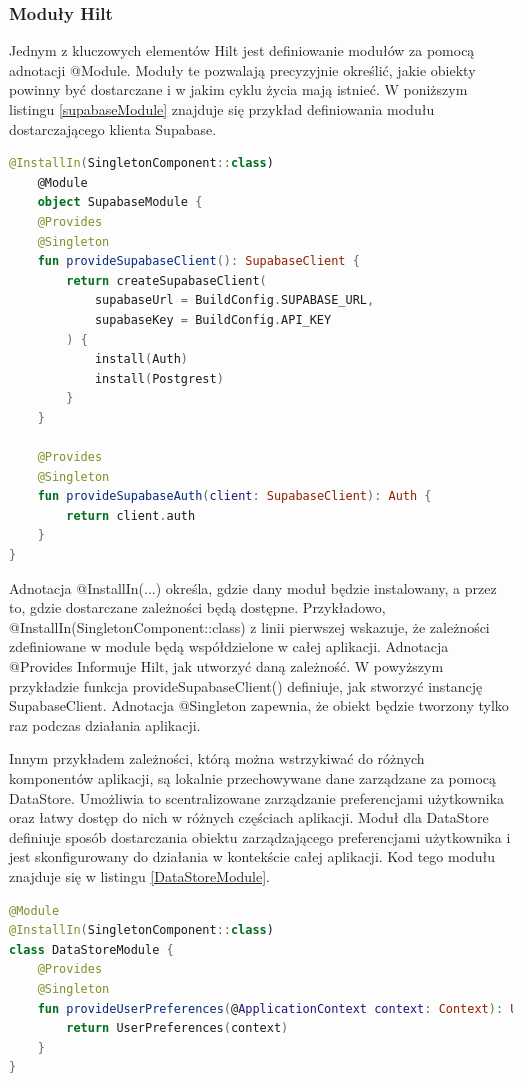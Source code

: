 \documentclass[12pt,twoside]{article}
\begin{document}
\subsubsection{Moduły Hilt}

Jednym z kluczowych elementów Hilt jest definiowanie modułów za pomocą adnotacji @Module. Moduły te pozwalają 
precyzyjnie określić, jakie obiekty powinny być dostarczane i w jakim cyklu życia mają istnieć. W poniższym listingu
\ref{supabaseModule} znajduje się przykład definiowania modułu dostarczającego klienta Supabase.
\begin{lstlisting}[language=Kotlin,caption=Przykład modułu klienta Supabase, label={supabaseModule}]
	@InstallIn(SingletonComponent::class)
	@Module
	object SupabaseModule {
    @Provides
    @Singleton
    fun provideSupabaseClient(): SupabaseClient {
        return createSupabaseClient(
            supabaseUrl = BuildConfig.SUPABASE_URL,
            supabaseKey = BuildConfig.API_KEY
        ) {
            install(Auth)
            install(Postgrest)
        }
    }

    @Provides
    @Singleton
    fun provideSupabaseAuth(client: SupabaseClient): Auth {
        return client.auth
    }
}
\end{lstlisting}
Adnotacja @InstallIn(...) określa, gdzie dany moduł będzie instalowany, a przez to, gdzie dostarczane zależności 
będą dostępne. Przykładowo, @InstallIn(SingletonComponent::class) z linii pierwszej wskazuje, że zależności 
zdefiniowane w module będą współdzielone w całej aplikacji. Adnotacja @Provides
Informuje Hilt, jak utworzyć daną zależność. W powyższym przykładzie funkcja provideSupabaseClient() definiuje, jak 
stworzyć instancję SupabaseClient. Adnotacja @Singleton zapewnia, że obiekt będzie tworzony tylko raz podczas działania 
aplikacji.

Innym przykładem zależności, którą można wstrzykiwać do różnych komponentów aplikacji, są lokalnie przechowywane 
dane zarządzane za pomocą DataStore. Umożliwia to scentralizowane zarządzanie preferencjami użytkownika oraz łatwy 
dostęp do nich w różnych częściach aplikacji. Moduł dla DataStore definiuje sposób dostarczania obiektu zarządzającego 
preferencjami użytkownika i jest skonfigurowany do działania w kontekście całej aplikacji. Kod tego modułu znajduje 
się w listingu \ref{DataStoreModule}.

\begin{lstlisting}[language=Kotlin,caption=Przykład modułu DataStore, label={DataStoreModule}]
@Module
@InstallIn(SingletonComponent::class)
class DataStoreModule {
    @Provides
    @Singleton
    fun provideUserPreferences(@ApplicationContext context: Context): UserPreferences {
        return UserPreferences(context)
    }
}
\end{lstlisting}
\end{document}
